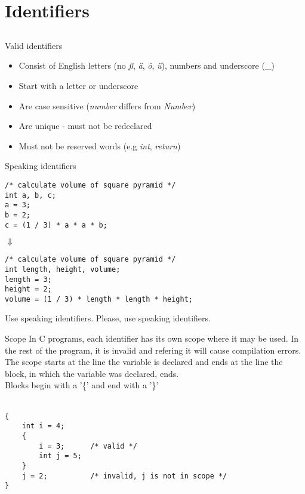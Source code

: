 \section{Identifiers}
\subsection{}
\begin{frame}{Valid identifiers}
	\begin{itemize}
		\item Consist of English letters (no \textit{ß}, \textit{ä}, \textit{ö}, \textit{ü}), numbers and underscore (\_)
		\item Start with a letter or underscore
		\item Are case sensitive (\textit{number} differs from \textit{Number})
		\item Are unique - must not be redeclared
		\item Must not be reserved words (e.g \textit{int}, \textit{return})
	\end{itemize}
\end{frame}
\begin{frame}[fragile]{Speaking identifiers}
	\begin{lstlisting}
/* calculate volume of square pyramid */
int a, b, c;
a = 3;
b = 2;
c = (1 / 3) * a * a * b;
\end{lstlisting}
\centering
$\Downarrow$
	\begin{lstlisting}
/* calculate volume of square pyramid */
int length, height, volume;
length = 3;
height = 2;
volume = (1 / 3) * length * length * height;
\end{lstlisting}
\end{frame}
\begin{frame}{Use speaking identifiers.}
	\LARGE
	\centering
	Please, use speaking identifiers.\footnotemark
	
\end{frame}
\begin{frame}[fragile]{Scope}
	In C programs, each identifier has its own scope where it may be used. In the rest of the program, it is invalid and refering it will cause compilation errors. \\
	The scope starts at the line the variable is declared and ends at the line the block, in which the variable was declared, ends. \\
	Blocks begin with a '\{' and end with a '\}'\\\ \\
	\begin{lstlisting}[numbers=none]
{
	int i = 4;
	{
		i = 3;		/* valid */
		int j = 5;
	}
	j = 2;			/* invalid, j is not in scope */
}
\end{lstlisting}
\end{frame}
